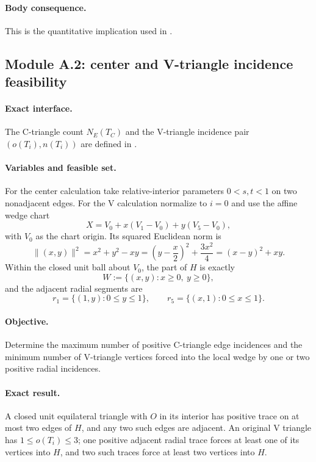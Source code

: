 \paragraph{Body consequence.}
This is the quantitative implication used in
.

\subsection{Module A.2: center and V-triangle incidence feasibility}

\paragraph{Exact interface.}
The C-triangle count $N_E(T_C)$ and the V-triangle incidence pair
$(o(T_i),n(T_i))$ are defined in .

\paragraph{Variables and feasible set.}
For the center calculation take relative-interior parameters $0<s,t<1$ on
two nonadjacent edges.  For the V calculation normalize to $i=0$ and use the
affine wedge chart
\[
 X=V_0+x(V_1-V_0)+y(V_5-V_0),
\]
with $V_0$ as the chart origin.  Its squared Euclidean norm is
\begin{equation}
 \lVert(x,y)\rVert^2=x^2+y^2-xy
 =\left(y-\frac x2\right)^2+\frac{3x^2}{4}
 =(x-y)^2+xy.
 \label{eq:app-wedge-norm}
\end{equation}
Within the closed unit ball about $V_0$, the part of $H$ is exactly
\[
 W:=\{(x,y):x\ge0,\ y\ge0\},
\]
and the adjacent radial segments are
\[
 r_1=\{(1,y):0\le y\le1\},
 \qquad
 r_5=\{(x,1):0\le x\le1\}.
\]

\paragraph{Objective.}
Determine the maximum number of positive C-triangle edge incidences and the
minimum number of V-triangle vertices forced into the local wedge by one or
two positive radial incidences.

\paragraph{Exact result.}

\begin{lemma}
\label{lem:app-center-v-incidence}
A closed unit equilateral triangle with $O$ in its interior has positive
trace on at most two edges of $H$, and any two such edges are adjacent.  An original V triangle has
$1\le o(T_i)\le3$; one positive adjacent radial trace forces at least one of
its vertices into $H$, and two such traces force at least two vertices into
$H$.
\end{lemma}

